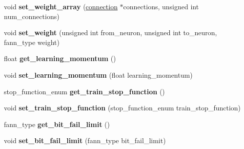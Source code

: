\begin{DoxyCompactItemize}
\item 
\hypertarget{class_f_a_n_n_1_1neural__net_adadc540cbce206195f2d3958a407c9cc}{void {\bfseries set\-\_\-weight\-\_\-array} (\hyperlink{structfann__connection}{connection} $\ast$connections, unsigned int num\-\_\-connections)}\label{class_f_a_n_n_1_1neural__net_adadc540cbce206195f2d3958a407c9cc}

\item 
\hypertarget{class_f_a_n_n_1_1neural__net_a921fd8fa496af465dde709a74a8707c2}{void {\bfseries set\-\_\-weight} (unsigned int from\-\_\-neuron, unsigned int to\-\_\-neuron, fann\-\_\-type weight)}\label{class_f_a_n_n_1_1neural__net_a921fd8fa496af465dde709a74a8707c2}

\item 
\hypertarget{class_f_a_n_n_1_1neural__net_a029de2713cbc7d76d57391b2fd312fe1}{float {\bfseries get\-\_\-learning\-\_\-momentum} ()}\label{class_f_a_n_n_1_1neural__net_a029de2713cbc7d76d57391b2fd312fe1}

\item 
\hypertarget{class_f_a_n_n_1_1neural__net_a981da3fd4e55aed51bf34ab9e2698479}{void {\bfseries set\-\_\-learning\-\_\-momentum} (float learning\-\_\-momentum)}\label{class_f_a_n_n_1_1neural__net_a981da3fd4e55aed51bf34ab9e2698479}

\item 
\hypertarget{class_f_a_n_n_1_1neural__net_a6ce6b4e64eaa9e4c8e72033d231b8f3c}{stop\-\_\-function\-\_\-enum {\bfseries get\-\_\-train\-\_\-stop\-\_\-function} ()}\label{class_f_a_n_n_1_1neural__net_a6ce6b4e64eaa9e4c8e72033d231b8f3c}

\item 
\hypertarget{class_f_a_n_n_1_1neural__net_abfa8e1b51af6e511feea49edf931f2a4}{void {\bfseries set\-\_\-train\-\_\-stop\-\_\-function} (stop\-\_\-function\-\_\-enum train\-\_\-stop\-\_\-function)}\label{class_f_a_n_n_1_1neural__net_abfa8e1b51af6e511feea49edf931f2a4}

\item 
\hypertarget{class_f_a_n_n_1_1neural__net_aeeb508393d4ca6f837a05bbeeb0a36b4}{fann\-\_\-type {\bfseries get\-\_\-bit\-\_\-fail\-\_\-limit} ()}\label{class_f_a_n_n_1_1neural__net_aeeb508393d4ca6f837a05bbeeb0a36b4}

\item 
\hypertarget{class_f_a_n_n_1_1neural__net_aa08c181762e7399eb2ee849262700e84}{void {\bfseries set\-\_\-bit\-\_\-fail\-\_\-limit} (fann\-\_\-type bit\-\_\-fail\-\_\-limit)}\label{class_f_a_n_n_1_1neural__net_aa08c181762e7399eb2ee849262700e84}


\end{DoxyCompactItemize}
